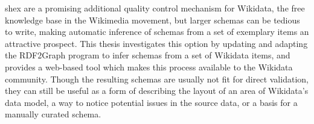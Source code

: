 
\Abstract
\acrlong{shex} are a promising additional quality control mechanism for \gls{Wikidata},
the free knowledge base in the \gls{Wikimedia} movement,
but larger \glspl{schema} can be tedious to write,
making automatic inference of \glspl{schema} from a set of exemplary \glspl{item} an attractive prospect. %
This thesis investigates %
this option by updating and adapting the \gls{RDF2Graph} program to infer \glspl{schema} from a set of \gls{Wikidata} \glspl{item},
and provides a web-based tool which makes this process available to the \gls{Wikidata} community.
Though the resulting \glspl{schema} are usually not fit for direct validation,
they can still be useful as a form of describing the layout of an area of \gls{Wikidata}’s data model,
a way to notice potential issues in the source data,
or a basis for a manually curated \gls{schema}.

